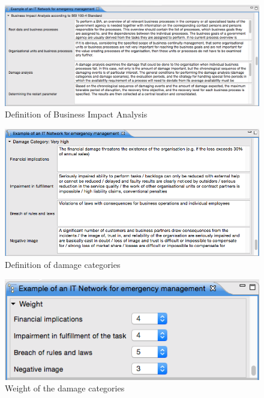 \documentclass[a4paper,10pt]{book}
\begin{document}
\begin{figure}[htb!]
  \centering
  \includegraphics[width=\linewidth]{Screenshot/definition-of-business-impact-analysis.png}
  \caption{Definition of Business Impact Analysis}
  \label{fig:definition-of-business-impact-analysis}
\end{figure}

\begin{figure}[!htb]
  \centering
  \includegraphics[width=\linewidth]{Screenshot/definition-of-damage-categories.png}
  \caption{Definition of damage categories}
  \label{fig:definition-of-damage-categories}
\end{figure}

\begin{figure}[!htb]
  \centering
  \includegraphics[scale=0.5]{Screenshot/weight-of-the-damage-categories.png}
  \caption{Weight of the damage categories}
  \label{fig:weight-of-the-damage-categories}
\end{figure}
\end{document}
